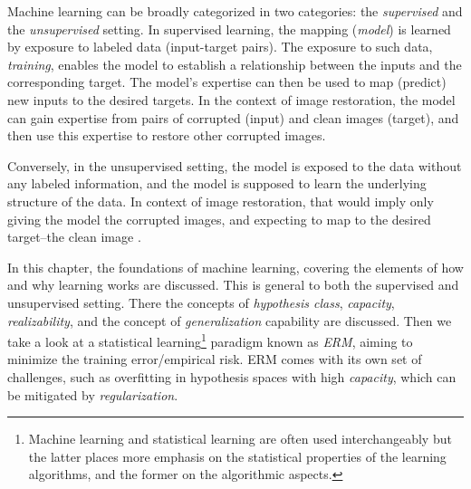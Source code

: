 Machine learning can be broadly categorized in two categories: the \textit{supervised} and the \textit{unsupervised} setting. In supervised learning, the mapping (\textit{model}) is learned by exposure to labeled data (input-target pairs). The exposure to such data, \textit{training}, enables the model to establish a relationship between the inputs and the corresponding target. The model’s expertise can then be used to map (predict) new inputs to the desired targets. In the context of image restoration, the model can gain expertise from pairs of corrupted (input) and clean images (target), and then use this expertise to restore other corrupted images.

Conversely, in the unsupervised setting, the model is exposed to the data without any labeled information, and the model is supposed to learn the underlying structure of the data. In context of image restoration, that would imply only giving the model the corrupted images, and expecting to map to the desired target--the clean image \cite{ulyanovDeepImagePrior2020,krullNoise2VoidLearningDenoising2018}.

In this chapter, the foundations of machine  learning, covering the elements of how and why learning works are discussed. This is general to both the supervised and unsupervised setting. There the concepts of \textit{hypothesis class}, \textit{capacity}, \textit{realizability}, and the concept of \textit{generalization} capability are discussed. Then we take a look at a statistical learning\footnote{Machine learning and statistical learning are often used interchangeably but the latter places more emphasis on the statistical properties of the learning algorithms, and the former on the algorithmic aspects.} paradigm known as \textit{\gls{ERM}}, aiming to minimize the training error/empirical risk. \Gls{ERM} comes with its own set of challenges, such as overfitting in hypothesis spaces with high \textit{capacity}, which can be mitigated by \textit{regularization}. 

